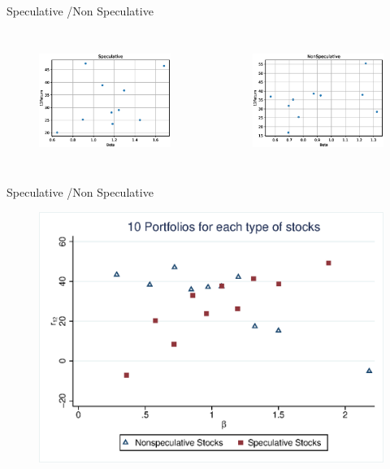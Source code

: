 \documentclass{beamer}
\begin{document}
\begin{frame}{Speculative /Non Speculative}
	\begin{columns}
			\begin{figure}
			\centering
			\includegraphics[width=\linewidth]{SpeculativeBetaReturn10.eps}
			\label{fig:SpeculativeBetaReturn10}
		\end{figure}
		\begin{figure}
			\centering
			\includegraphics[width=\linewidth]{NonSpeculativeBetaReturn10.eps}
			\label{fig:NonSpeculativeBetaReturn10}
		\end{figure}
	\end{columns}
\end{frame}


\begin{frame}{Speculative /Non Speculative}
	\begin{figure}
		\centering
		\includegraphics[width=0.7\linewidth]{10Sportfo.eps}
		\label{fig:speculativebetareturn}
	\end{figure}
	
\end{frame}
\end{document}
